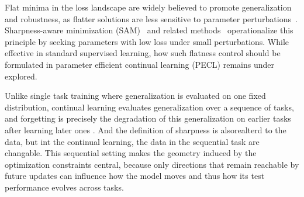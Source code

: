 \documentclass{article}
\theoremstyle{plain}
\theoremstyle{definition}
\theoremstyle{remark}
\begin{document}
Flat minima in the loss landscape are widely believed to promote generalization and robustness, as flatter solutions are less sensitive to parameter perturbations~\citep{FlatMinima1997,wu2017understandinggeneralizationdeeplearning,chaudhariEntropySGDBiasingGradient2019,NEURIPS2020_518a38cc,NEURIPS2021_995f5e03,JMLRAnEmpiricalInvestigatio,yangRevisitingFlatnessAwareOptimization2025}.
Sharpness-aware minimization (SAM)~\cite{foretSharpnessAwareMinimizationEfficiently2021} and related methods~\citep{pmlr-v151-bisla22a,zhangGradientNormAware2023,NEURIPS2024_C-Flat} operationalize this principle by seeking parameters with low loss  under small perturbations. 
While effective in standard supervised learning, how such flatness control should be formulated in parameter efficient continual learning (PECL) remains under explored.



Unlike single task training where generalization is evaluated on one fixed distribution, continual learning evaluates generalization over a sequence of tasks, and forgetting is precisely the degradation of this generalization on earlier tasks after learning later ones \cite{}. And the definition of sharpness is alsorealterd to the data, but int the continual  learning, the data in the sequential task are changable.
This sequential setting makes the geometry induced by the optimization constraints central, because only directions that remain reachable by future updates can influence how the model moves and thus how its test performance evolves across tasks.
\end{document}
